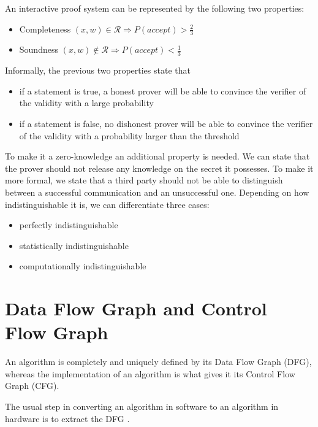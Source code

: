 An interactive proof system can be represented by the following two
properties:
\begin{itemize}
\item Completeness $(x,w) \in \mathcal{R} \Rightarrow P(accept) > \frac{2}{3}$
\item Soundness $(x,w) \notin \mathcal{R} \Rightarrow P(accept) < \frac{1}{3}$
\end{itemize}

Informally, the previous two properties state that
\begin{itemize}
\item if a statement is true, a honest prover will be able to convince the verifier of the validity with a large probability
\item if a statement is false, no dishonest prover will be able to convince the verifier of the validity with a probability larger than the threshold
\end{itemize}

To make it a zero-knowledge an additional property is needed. We can
state that the prover should not release any knowledge on the secret
it possesses. To make it more formal, we state that a third party
should not be able to distinguish between a successful communication
and an unsuccessful one. Depending on how indistinguishable it is, we
can differentiate three cases:
\begin{itemize}
\item perfectly indistinguishable
\item statistically indistinguishable
\item computationally indistinguishable
\end{itemize}

\section{Data Flow Graph and Control Flow Graph}

An algorithm is completely and uniquely defined by its Data Flow Graph (DFG),
whereas the implementation of an algorithm is what gives it its Control Flow
Graph (CFG).

The usual step in converting an algorithm in software to an algorithm
in hardware is to extract the DFG \cite{Schaumont}.

